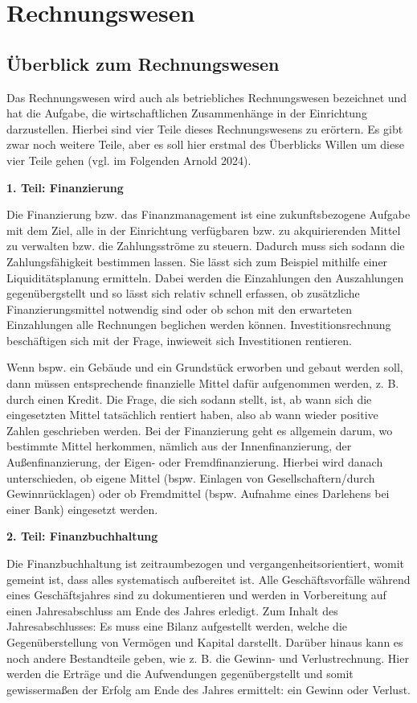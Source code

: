 \documentclass[
  letterpaper,
]{book}
\begin{document}
\section{Rechnungswesen}\label{rechnungswesen}

\subsection{Überblick zum
Rechnungswesen}\label{ueberblick-zum-rechnungswesen}

Das Rechnungswesen wird auch als betriebliches Rechnungswesen bezeichnet
und hat die Aufgabe, die wirtschaftlichen Zusammenhänge in der
Einrichtung darzustellen. Hierbei sind vier Teile dieses Rechnungswesens
zu erörtern. Es gibt zwar noch weitere Teile, aber es soll hier erstmal
des Überblicks Willen um diese vier Teile gehen (vgl. im Folgenden
Arnold 2024).

\textbf{1. Teil: Finanzierung}

Die Finanzierung bzw. das Finanzmanagement ist eine zukunftsbezogene
Aufgabe mit dem Ziel, alle in der Einrichtung verfügbaren bzw. zu
akquirierenden Mittel zu verwalten bzw. die Zahlungsströme zu steuern.
Dadurch muss sich sodann die Zahlungsfähigkeit bestimmen lassen. Sie
lässt sich zum Beispiel mithilfe einer Liquiditätsplanung ermitteln.
Dabei werden die Einzahlungen den Auszahlungen gegenübergstellt und so
lässt sich relativ schnell erfassen, ob zusätzliche Finanzierungsmittel
notwendig sind oder ob schon mit den erwarteten Einzahlungen alle
Rechnungen beglichen werden können. Investitionsrechnung beschäftigen
sich mit der Frage, inwieweit sich Investitionen rentieren.

Wenn bspw. ein Gebäude und ein Grundstück erworben und gebaut werden
soll, dann müssen entsprechende finanzielle Mittel dafür aufgenommen
werden, z. B. durch einen Kredit. Die Frage, die sich sodann stellt,
ist, ab wann sich die eingesetzten Mittel tatsächlich rentiert haben,
also ab wann wieder positive Zahlen geschrieben werden. Bei der
Finanzierung geht es allgemein darum, wo bestimmte Mittel herkommen,
nämlich aus der Innenfinanzierung, der Außenfinanzierung, der Eigen-
oder Fremdfinanzierung. Hierbei wird danach unterschieden, ob eigene
Mittel (bspw. Einlagen von Gesellschaftern/durch Gewinnrücklagen) oder
ob Fremdmittel (bspw. Aufnahme eines Darlehens bei einer Bank)
eingesetzt werden.

\textbf{2. Teil: Finanzbuchhaltung}

Die Finanzbuchhaltung ist zeitraumbezogen und vergangenheitsorientiert,
womit gemeint ist, dass alles systematisch aufbereitet ist. Alle
Geschäftsvorfälle während eines Geschäftsjahres sind zu dokumentieren
und werden in Vorbereitung auf einen Jahresabschluss am Ende des Jahres
erledigt. Zum Inhalt des Jahresabschlusses: Es muss eine Bilanz
aufgestellt werden, welche die Gegenüberstellung von Vermögen und
Kapital darstellt. Darüber hinaus kann es noch andere Bestandteile
geben, wie z. B. die Gewinn- und Verlustrechnung. Hier werden die
Erträge und die Aufwendungen gegenübergstellt und somit gewissermaßen
der Erfolg am Ende des Jahres ermittelt: ein Gewinn oder Verlust.
\end{document}
